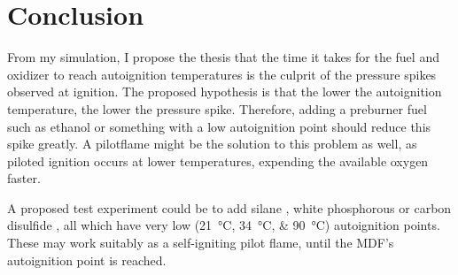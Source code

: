 \chapter{Conclusion}

From my simulation, I propose the thesis that the time it takes for the fuel and oxidizer to reach autoignition temperatures is the culprit of the pressure spikes observed at ignition. The proposed hypothesis is that the lower the autoignition temperature, the lower the pressure spike. Therefore, adding a preburner fuel such as ethanol or something with a low autoignition point should reduce this spike greatly. A pilotflame might be the solution to this problem as well, as piloted ignition occurs at lower temperatures, expending the available oxygen faster.

A proposed test experiment could be to add silane , white phosphorous  or carbon disulfide , all which have very low (\SIlist{21;34;90}{\celsius}) autoignition points. These may work suitably as a self-igniting pilot flame, until the MDF's autoignition point is reached. 

